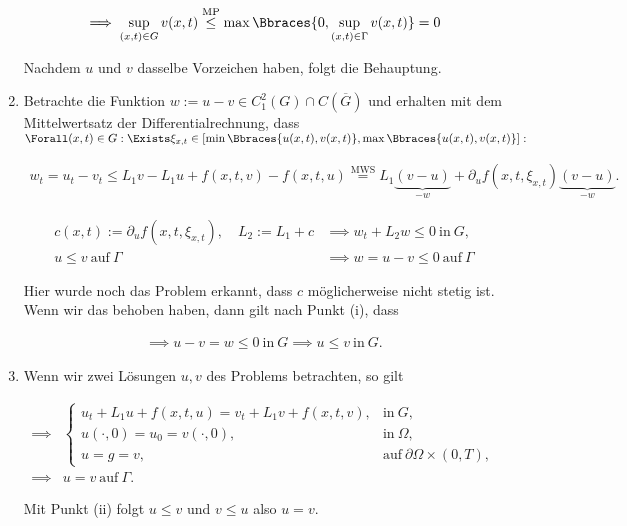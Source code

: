 \begin{solution}
\begin{enumerate}[label = (\roman*)]
  \begin{align*}
    \implies
    \sup_{(x, t) \in G} v(x, t)
    \stackrel{\mathrm{MP}}{\leq}
    \max \Bbraces{0, \sup_{(x, t) \in \Gamma} v(x,t)}
    =
    0
  \end{align*}

  Nachdem $u$ und $v$ dasselbe Vorzeichen haben, folgt die Behauptung.

  \item Betrachte die Funktion $w := u - v \in C_1^2(G) \cap C(\overline{G})$ und erhalten mit dem Mittelwertsatz der Differentialrechnung, dass $\Forall (x, t) \in G: \Exists \xi_{x, t} \in [\min \Bbraces{u(x, t), v(x, t)}, \max \Bbraces{u(x, t), v(x, t)}]:$

  \begin{align*}
    w_t
    =
    u_t - v_t
    \leq
    L_1 v - L_1 u + f(x, t, v) - f(x, t, u)
    \stackrel
    {
      \mathrm{MWS}
    }{=}
    L_1 \underbrace{(v - u)}_{-w} + \partial_u f(x, t, \xi_{x, t}) \underbrace{(v - u)}_{-w}.
  \end{align*}

  \begin{align*}
    c(x, t) := \partial_u f(x, t,\xi_{x, t}),
    \quad
    L_2 := L_1 + c
    & \implies
    w_t + L_2 w \leq 0 ~\text{in}~ G, \\
    u \leq v ~\text{auf}~ \Gamma
    & \implies
    w = u - v \leq 0 ~\text{auf}~ \Gamma
  \end{align*}

  Hier wurde noch das Problem erkannt, dass $c$ möglicherweise nicht stetig ist.
  Wenn wir das behoben haben, dann gilt nach Punkt (i), dass

  \begin{align*}
    \implies
    u - v = w \leq 0 ~\text{in}~ G
    \implies
    u \leq v ~\text{in}~ G.
  \end{align*}

  \item Wenn wir zwei Lösungen $u, v$ des Problems betrachten, so gilt 

  \begin{align*}
    \implies &
    \begin{cases}
      u_t + L_1 u + f(x, t, u) = v_t + L_1 v + f(x, t, v), & \text{in}~ G, \\
      u(\cdot, 0) = u_0 = v(\cdot, 0),                     & \text{in}~ \Omega, \\
      u = g = v,                                           & \text{auf}~ \partial \Omega \times (0, T),
    \end{cases} \\
    \implies &
    u = v ~\text{auf}~ \Gamma.
  \end{align*}

  Mit Punkt (ii) folgt $u \leq v$ und $v \leq u$ also $u = v$. 

\end{enumerate}

\end{solution}

